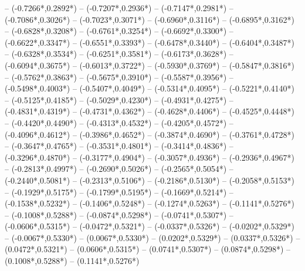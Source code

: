 {	-- ({-0.7266*\dx},{0.2892*\dy})
	-- ({-0.7207*\dx},{0.2936*\dy})
	-- ({-0.7147*\dx},{0.2981*\dy})
	-- ({-0.7086*\dx},{0.3026*\dy})
	-- ({-0.7023*\dx},{0.3071*\dy})
	-- ({-0.6960*\dx},{0.3116*\dy})
	-- ({-0.6895*\dx},{0.3162*\dy})
	-- ({-0.6828*\dx},{0.3208*\dy})
	-- ({-0.6761*\dx},{0.3254*\dy})
	-- ({-0.6692*\dx},{0.3300*\dy})
	-- ({-0.6622*\dx},{0.3347*\dy})
	-- ({-0.6551*\dx},{0.3393*\dy})
	-- ({-0.6478*\dx},{0.3440*\dy})
	-- ({-0.6404*\dx},{0.3487*\dy})
	-- ({-0.6328*\dx},{0.3534*\dy})
	-- ({-0.6251*\dx},{0.3581*\dy})
	-- ({-0.6173*\dx},{0.3628*\dy})
	-- ({-0.6094*\dx},{0.3675*\dy})
	-- ({-0.6013*\dx},{0.3722*\dy})
	-- ({-0.5930*\dx},{0.3769*\dy})
	-- ({-0.5847*\dx},{0.3816*\dy})
	-- ({-0.5762*\dx},{0.3863*\dy})
	-- ({-0.5675*\dx},{0.3910*\dy})
	-- ({-0.5587*\dx},{0.3956*\dy})
	-- ({-0.5498*\dx},{0.4003*\dy})
	-- ({-0.5407*\dx},{0.4049*\dy})
	-- ({-0.5314*\dx},{0.4095*\dy})
	-- ({-0.5221*\dx},{0.4140*\dy})
	-- ({-0.5125*\dx},{0.4185*\dy})
	-- ({-0.5029*\dx},{0.4230*\dy})
	-- ({-0.4931*\dx},{0.4275*\dy})
	-- ({-0.4831*\dx},{0.4319*\dy})
	-- ({-0.4731*\dx},{0.4362*\dy})
	-- ({-0.4628*\dx},{0.4406*\dy})
	-- ({-0.4525*\dx},{0.4448*\dy})
	-- ({-0.4420*\dx},{0.4490*\dy})
	-- ({-0.4313*\dx},{0.4532*\dy})
	-- ({-0.4205*\dx},{0.4572*\dy})
	-- ({-0.4096*\dx},{0.4612*\dy})
	-- ({-0.3986*\dx},{0.4652*\dy})
	-- ({-0.3874*\dx},{0.4690*\dy})
	-- ({-0.3761*\dx},{0.4728*\dy})
	-- ({-0.3647*\dx},{0.4765*\dy})
	-- ({-0.3531*\dx},{0.4801*\dy})
	-- ({-0.3414*\dx},{0.4836*\dy})
	-- ({-0.3296*\dx},{0.4870*\dy})
	-- ({-0.3177*\dx},{0.4904*\dy})
	-- ({-0.3057*\dx},{0.4936*\dy})
	-- ({-0.2936*\dx},{0.4967*\dy})
	-- ({-0.2813*\dx},{0.4997*\dy})
	-- ({-0.2690*\dx},{0.5026*\dy})
	-- ({-0.2565*\dx},{0.5054*\dy})
	-- ({-0.2440*\dx},{0.5081*\dy})
	-- ({-0.2313*\dx},{0.5106*\dy})
	-- ({-0.2186*\dx},{0.5130*\dy})
	-- ({-0.2058*\dx},{0.5153*\dy})
	-- ({-0.1929*\dx},{0.5175*\dy})
	-- ({-0.1799*\dx},{0.5195*\dy})
	-- ({-0.1669*\dx},{0.5214*\dy})
	-- ({-0.1538*\dx},{0.5232*\dy})
	-- ({-0.1406*\dx},{0.5248*\dy})
	-- ({-0.1274*\dx},{0.5263*\dy})
	-- ({-0.1141*\dx},{0.5276*\dy})
	-- ({-0.1008*\dx},{0.5288*\dy})
	-- ({-0.0874*\dx},{0.5298*\dy})
	-- ({-0.0741*\dx},{0.5307*\dy})
	-- ({-0.0606*\dx},{0.5315*\dy})
	-- ({-0.0472*\dx},{0.5321*\dy})
	-- ({-0.0337*\dx},{0.5326*\dy})
	-- ({-0.0202*\dx},{0.5329*\dy})
	-- ({-0.0067*\dx},{0.5330*\dy})
	-- ({0.0067*\dx},{0.5330*\dy})
	-- ({0.0202*\dx},{0.5329*\dy})
	-- ({0.0337*\dx},{0.5326*\dy})
	-- ({0.0472*\dx},{0.5321*\dy})
	-- ({0.0606*\dx},{0.5315*\dy})
	-- ({0.0741*\dx},{0.5307*\dy})
	-- ({0.0874*\dx},{0.5298*\dy})
	-- ({0.1008*\dx},{0.5288*\dy})
	-- ({0.1141*\dx},{0.5276*\dy})
}
